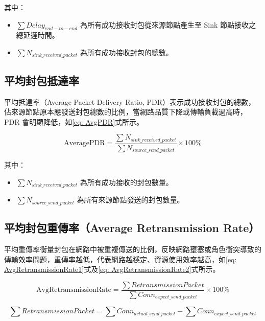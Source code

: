 \begin{ZhChapter}
其中：
\begin{itemize}
    \item $\sum Delay_{end-to-end}$ 為所有成功接收封包從來源節點產生至 Sink 節點接收之總延遲時間。
    \item $\sum N_{sink\_received\_packet}$ 為所有成功接收封包的總數。
\end{itemize}

\subsection{平均封包抵達率}

平均抵達率（Average Packet Delivery Ratio, PDR）表示成功接收封包的總數，佔來源節點原本應發送封包總數的比例，當網路品質下降或傳輸負載過高時，PDR 會明顯降低，如\ref{eq: AvgPDR}式所示。

\begin{equation}
\label{eq: AvgPDR}
\text{AveragePDR} = \frac{\sum N_{sink\_received\_packet}}{\sum N_{source\_send\_packet}} \times 100\%
\end{equation}

其中：
\begin{itemize}
    \item $\sum N_{sink\_received\_packet}$ 為所有成功接收的封包數量。
    \item $\sum N_{source\_send\_packet}$ 為所有來源節點發送的封包數量。
\end{itemize}

\subsection{平均封包重傳率（Average Retransmission Rate）}

平均重傳率衡量封包在網路中被重複傳送的比例，反映網路壅塞或角色衝突導致的傳輸效率問題，重傳率越低，代表網路越穩定、資源使用效率越高，如\ref{eq: AvgRetransmissionRate1}式及\ref{eq: AvgRetransmissionRate2}式所示。

\begin{equation}
\label{eq: AvgRetransmissionRate1}
\text{AvgRetransmissionRate} = \frac{\sum RetransmissionPacket}{\sum Conn_{expect\_send\_packet}} \times 100\%
\end{equation}

\begin{equation}
\label{eq: AvgRetransmissionRate2}
\sum RetransmissionPacket = \sum Conn_{actual\_send\_packet} - \sum Conn_{expect\_send\_packet}
\end{equation}


\end{ZhChapter}
